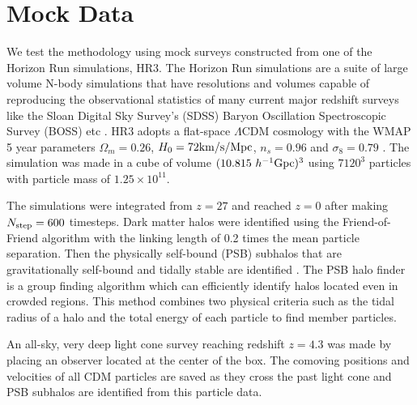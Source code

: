 \documentclass[useAMS,usenatbib]{mn2e}
\newcommand{\hMsun}{{\ifmmode{h^{-1}{\rm
        {M_{\odot}}}}\else{$h^{-1}{\rm{M_{\odot}}}$~}\fi}}
\begin{document}
\section{Mock Data}
\label{sec:mocks}
We test the methodology using mock surveys constructed from one of the Horizon Run simulations, HR3.
The Horizon Run simulations are a suite of large volume N-body simulations that have resolutions and volumes capable of reproducing the observational statistics of many current major redshift surveys like the Sloan Digital Sky Survey's (SDSS) Baryon Oscillation Spectroscopic Survey (BOSS) etc \citep{park 2005,2009ApJ...701.1547K,horizonrun}.
HR3 adopts a flat-space $\Lambda$CDM cosmology with the WMAP 5 year parameters
$\Omega_{m}=0.26$, $H_{0}=72{\rm km/s/Mpc}$, $n_{s}=0.96$ and $\sigma_8=0.79$ \citep[]{komatsu 2011}.
The simulation was made in a cube of volume $(10.815 {~ h^{-1}} {\rm{Gpc}})^3$
using $7120^3$ particles with particle mass of $1.25\times 10^{11}$\hMsun.

The simulations were integrated from $z=27$ and reached $z=0$ after making $N_{\rm step}=600$ timesteps.
Dark matter halos were identified using the Friend-of-Friend algorithm with the linking length of 0.2 times the mean particle separation.
Then the physically self-bound (PSB) subhalos that are gravitationally self-bound and tidally stable are identified \citep{kim and park 2006}.
The PSB halo finder is a group finding algorithm which can efficiently identify halos located even in crowded regions. 
This method combines two physical criteria such as the tidal radius of a halo and the total energy of each particle to find member particles.

An all-sky, very deep light cone survey reaching redshift $z=4.3$ was made by placing an observer located at the center of the box.
The comoving positions and velocities of all CDM particles are saved as they cross the past light cone
and PSB subhalos are identified from this particle data.
\end{document}
